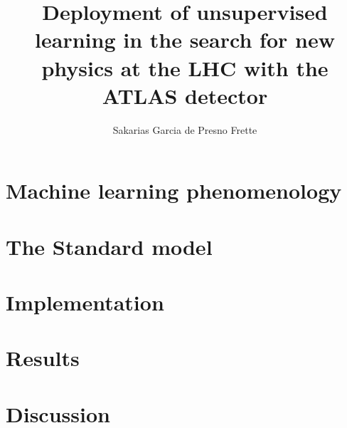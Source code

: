 \documentclass[UKenglish]{book}
\title{Deployment of unsupervised learning in the search for new physics at the LHC with the ATLAS detector}
\subtitle{}
\author{Sakarias Garcia de Presno Frette}
\begin{document}
\duoforside[dept={Department of Physics},
  program={Master's Program Name},
  long]                                         

\frontmatter{}


\tableofcontents{}

\mainmatter{}






               

\chapter{Machine learning phenomenology}\label{Chap:MLphenom}



\chapter{The Standard model}\label{Chap:SM}


\chapter{Implementation}\label{Chap:implementation}



\chapter{Results}\label{Chap:results}



\chapter{Discussion}\label{Chap:discussion}




\backmatter{}
\end{document}

